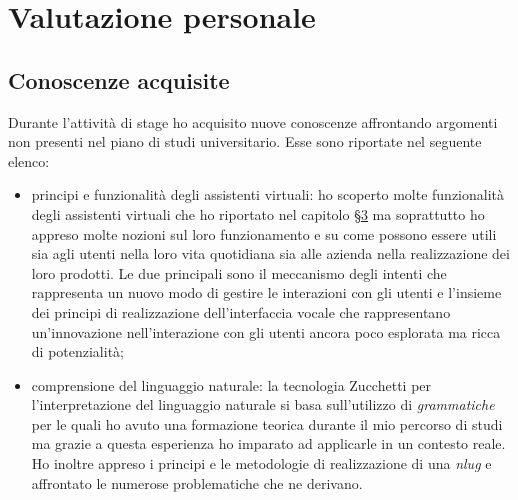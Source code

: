 \section{Valutazione personale}
\subsection{Conoscenze acquisite}
Durante l'attività di stage ho acquisito nuove conoscenze affrontando argomenti non presenti nel piano di studi universitario. Esse sono riportate nel seguente elenco:
\begin{itemize}
	\item principi e funzionalità degli assistenti virtuali: ho scoperto molte funzionalità degli assistenti virtuali che ho riportato nel capitolo  §\hyperref[cap:descrizione-stage]{3} ma soprattutto ho appreso molte nozioni sul loro funzionamento e su come possono essere utili sia agli utenti nella loro vita quotidiana sia alle azienda nella realizzazione dei loro prodotti. Le due principali sono il meccanismo degli intenti che rappresenta un nuovo modo di gestire le interazioni con gli utenti e l'insieme dei principi di realizzazione dell'interfaccia vocale che rappresentano un'innovazione nell'interazione con gli utenti ancora poco esplorata ma ricca di potenzialità;
	\item comprensione del linguaggio naturale: la tecnologia Zucchetti per l'interpretazione del linguaggio naturale si basa sull'utilizzo di \emph{grammatiche} per le quali ho avuto una formazione teorica durante il mio percorso di studi ma grazie a questa esperienza ho imparato ad applicarle in un contesto reale. Ho inoltre appreso i principi e le metodologie di realizzazione di una \emph{\gls{nlug}} e affrontato le numerose problematiche che ne derivano.
\end{itemize}
